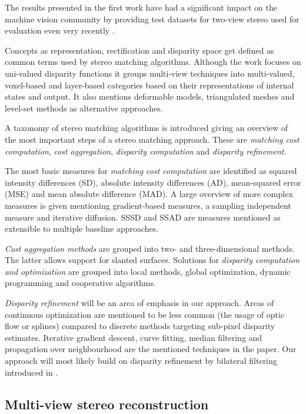 \documentclass{ucl_thesis}
\begin{document}
\par The results presented in the first work have had a significant impact on the machine vision community by providing test datasets for two-view stereo used for evaluation even very recently \cite{Yang12} \cite{MacAodhaDepthSuperResECCV2012}. 
\par Concepts as representation, rectification and disparity space get defined as common terms used by stereo matching algorithms. Although the work focuses on uni-valued disparity functions it groups multi-view techniques into multi-valued, voxel-based and layer-based categories based on their representations of internal states and output. It also mentions deformable models, triangulated meshes and level-set methods as alternative approaches.
\par A taxonomy of stereo matching algorithms is introduced giving an overview of the most important steps of a stereo matching approach. These are {\it matching cost computation}, {\it cost aggregation}, {\it disparity computation} and {\it disparity refinement}.
\par The most basic measures for {\it matching cost computation} are identified as squared intensity differences (SD), absolute intensity differences (AD), mean-squared error (MSE) and mean absolute difference (MAD). A large overview of more complex measures is given mentioning gradient-based measures, a sampling independent measure and iterative diffusion. SSSD and SSAD are measures mentioned as extensible to multiple baseline approaches.
\par {\it Cost aggregation methods} are grouped into two- and three-dimensional methods. The latter allows support for slanted surfaces. Solutions for {\it disparity computation and optimization} are grouped into local methods, global optimization, dynamic programming and cooperative algorithms. 
\par {\it Disparity refinement} will be an area of emphasis in our approach. Areas of continuous optimization are mentioned to be less common (the usage of optic flow or splines) compared to discrete methods targeting sub-pixel disparity estimates. Iterative gradient descent, curve fitting, median filtering and propagation over neighbourhood are the mentioned techniques in the paper. Our approach will most likely build on disparity refinement by bilateral filtering introduced in \cite{cvpr-07-qingxiong-yang}.

\subsection{Multi-view stereo reconstruction}
\end{document}
